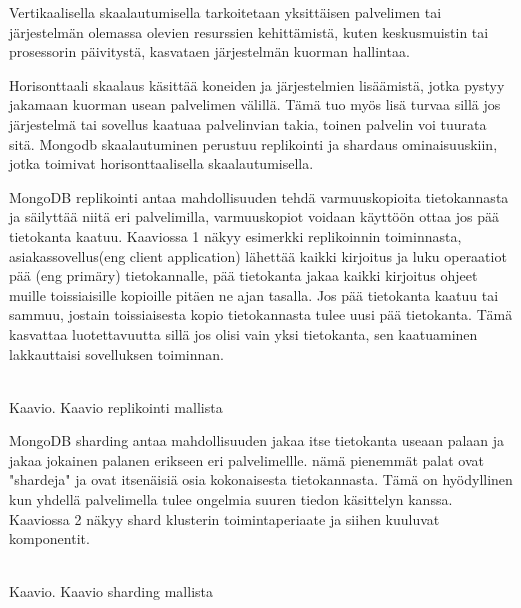 Vertikaalisella skaalautumisella tarkoitetaan yksittäisen palvelimen tai järjestelmän olemassa olevien resurssien kehittämistä, 
kuten keskusmuistin tai prosessorin päivitystä, kasvataen järjestelmän kuorman hallintaa.
\medskip

Horisonttaali skaalaus käsittää koneiden ja järjestelmien lisäämistä, jotka pystyy jakamaan kuorman usean palvelimen välillä.
Tämä tuo myös lisä turvaa sillä jos järjestelmä tai sovellus kaatuaa palvelinvian takia, 
toinen palvelin voi tuurata sitä. 
Mongodb skaalautuminen perustuu replikointi ja shardaus ominaisuuskiin, jotka toimivat horisonttaalisella skaalautumisella. \citemissing
\medskip






MongoDB replikointi antaa mahdollisuuden tehdä varmuuskopioita tietokannasta ja säilyttää niitä eri palvelimilla, 
varmuuskopiot voidaan käyttöön ottaa jos pää tietokanta kaatuu. 
%
Kaaviossa 1 näkyy esimerkki replikoinnin toiminnasta, asiakassovellus(eng client application) lähettää kaikki kirjoitus ja luku operaatiot pää (eng primäry) tietokannalle, 
pää tietokanta jakaa kaikki kirjoitus ohjeet muille toissiaisille kopioille pitäen ne ajan tasalla.
Jos pää tietokanta kaatuu tai sammuu, jostain toissiaisesta kopio tietokannasta tulee uusi pää tietokanta.
Tämä kasvattaa luotettavuutta sillä jos olisi vain yksi tietokanta, sen kaatuaminen lakkauttaisi sovelluksen toiminnan. 
\medskip
\bigskip

\\
Kaavio\getChartCount{}. Kaavio replikointi mallista 
\medskip



MongoDB sharding antaa mahdollisuuden jakaa itse tietokanta useaan palaan ja jakaa jokainen palanen erikseen eri palvelimellle.
nämä pienemmät palat ovat "shardeja"{} ja ovat itsenäisiä osia kokonaisesta tietokannasta.
%
Tämä on hyödyllinen kun yhdellä palvelimella tulee ongelmia suuren tiedon käsittelyn kanssa.
Kaaviossa 2 näkyy shard klusterin toimintaperiaate ja siihen kuuluvat komponentit. 
\medskip
\bigskip




\\
Kaavio\getChartCount{}. Kaavio sharding mallista 
\medskip


